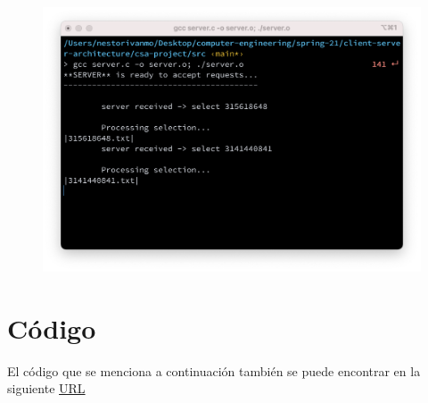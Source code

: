 \documentclass{article}
\begin{document}
\begin{enumerate}
\begin{figure}[H]
		    \includegraphics[scale=0.4]{imgs/server_selection}		    
		\end{figure}	
\end{enumerate}


\section{Código}

El código que se menciona a continuación también se puede encontrar en la siguiente \href{https://github.com/nestorivanmo/computer-engineering/tree/main/spring-21/client-server-architecture/csa-project/src}{URL}
\end{document}
